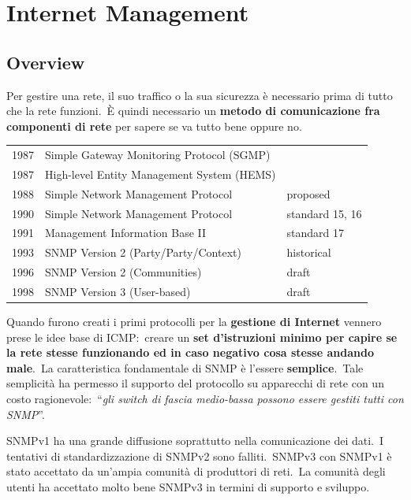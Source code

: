 \chapter{Internet Management}

\section{Overview}

Per gestire una rete, il suo traffico o la sua sicurezza è necessario prima di tutto che la rete funzioni.\
È quindi necessario un \textbf{metodo di comunicazione fra componenti di rete} per sapere se va tutto bene oppure no.\

\begin{table}[H]
    \centering
    \begin{tabular}{l l l}
        1987 & Simple Gateway Monitoring Protocol (SGMP)  &                 \\
        1987 & High-level Entity Management System (HEMS) &                 \\
        1988 & Simple Network Management Protocol         & proposed        \\
        1990 & Simple Network Management Protocol         & standard 15, 16 \\
        1991 & Management Information Base II             & standard 17     \\
        1993 & SNMP Version 2 (Party/Party/Context)       & historical      \\
        1996 & SNMP Version 2 (Communities)               & draft           \\
        1998 & SNMP Version 3 (User-based)                & draft           \\
    \end{tabular}
\end{table}

\noindent Quando furono creati i primi protocolli per la \textbf{gestione di Internet} vennero prese le idee base di ICMP:\ creare un \textbf{set d'istruzioni minimo per capire se la rete stesse funzionando ed in caso negativo cosa stesse andando male}.\
La caratteristica fondamentale di SNMP è l'essere \textbf{semplice}.\
Tale semplicità ha permesso il supporto del protocollo su apparecchi di rete con un costo ragionevole:\ ``\textit{gli switch di fascia medio-bassa possono essere gestiti tutti con SNMP}''.

SNMPv1 ha una grande diffusione soprattutto nella comunicazione dei dati.\
I tentativi di standardizzazione di SNMPv2 sono falliti.\
SNMPv3 con SNMPv1 è stato accettato da un'ampia comunità di produttori di reti.\
La comunità degli utenti ha accettato molto bene SNMPv3 in termini di supporto e sviluppo.

